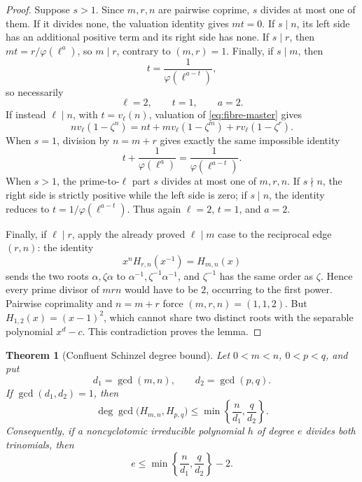 \documentclass[11pt]{article}
\numberwithin{equation}{section}
\newtheorem{theorem}{Theorem}[section]
\theoremstyle{definition}
\begin{document}
\begin{proof}
Suppose \(s>1\).  Since \(m,r,n\) are pairwise coprime, \(s\) divides at
most one of them.  If it divides none, the valuation identity gives
\(mt=0\).  If \(s\mid n\), its left side has an additional positive term
and its right side has none.  If \(s\mid r\), then
\(mt=r/\varphi(\ell^a)\), so \(m\mid r\), contrary to \((m,r)=1\).
Finally, if \(s\mid m\), then
\[
 t=\frac1{\varphi(\ell^{a-t})},
\]
so necessarily
\[
 \ell=2,\qquad t=1,\qquad a=2.
\]
If instead \(\ell\mid n\), with \(t=v_\ell(n)\), valuation of
\eqref{eq:fibre-master} gives
\[
 n v_\ell(1-\zeta^n)
 =nt+m v_\ell(1-\zeta^m)+r v_\ell(1-\zeta^r).
\]
When \(s=1\), division by \(n=m+r\) gives exactly the same impossible
identity
\[
 t+\frac1{\varphi(\ell^a)}
 =\frac1{\varphi(\ell^{a-t})}.
\]
When \(s>1\), the prime-to-\(\ell\) part \(s\) divides at most one of
\(m,r,n\).  If \(s\nmid n\), the right side is strictly positive while the
left side is zero; if \(s\mid n\), the identity reduces to
\(t=1/\varphi(\ell^{a-t})\).  Thus again
\(\ell=2\), \(t=1\), and \(a=2\).

Finally, if \(\ell\mid r\), apply the already proved \(\ell\mid m\) case to
the reciprocal edge \((r,n)\): the identity
\[
 x^nH_{r,n}(x^{-1})=H_{m,n}(x)
\]
sends the two roots \(\alpha,\zeta\alpha\) to
\(\alpha^{-1},\zeta^{-1}\alpha^{-1}\), and \(\zeta^{-1}\) has the same
order as \(\zeta\).  Hence every prime divisor of \(mrn\) would have to be
\(2\), occurring to the first power.  Pairwise coprimality and \(n=m+r\)
force \((m,r,n)=(1,1,2)\).  But
\(H_{1,2}(x)=(x-1)^2\), which cannot share two distinct roots with the
separable polynomial \(x^d-c\).  This contradiction proves the lemma.
\end{proof}

\begin{theorem}[Confluent Schinzel degree bound]
\label{thm:schinzelbound}
Let \(0<m<n\), \(0<p<q\), and put
\[
 d_1=\gcd(m,n),\qquad d_2=\gcd(p,q).
\]
If \(\gcd(d_1,d_2)=1\), then
\begin{equation}
 \deg\gcd\bigl(H_{m,n},H_{p,q}\bigr)
 \leq
 \min\left\{\frac n{d_1},\frac q{d_2}\right\}.
 \label{eq:14-1}
\end{equation}
Consequently, if a noncyclotomic irreducible polynomial \(h\) of degree
\(e\) divides both trinomials, then
\begin{equation}
 e\leq
 \min\left\{\frac n{d_1},\frac q{d_2}\right\}-2.
 \label{eq:14-2}
\end{equation}
\end{theorem}
\end{document}
